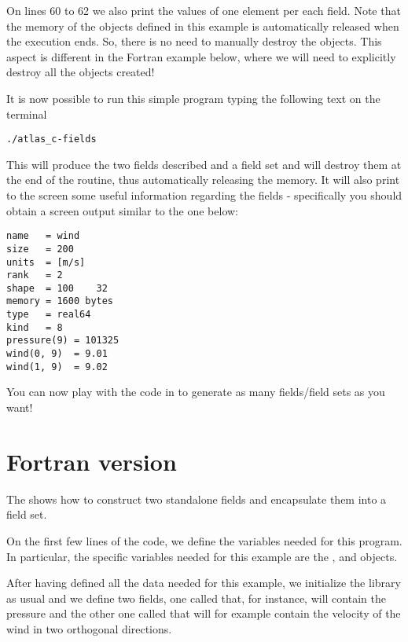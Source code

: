 On lines 60 to 62 we also print the values of one element 
per each field. Note that the memory of the objects defined 
in this example is automatically released when the execution 
ends. So, there is no need to manually destroy the objects.
This aspect is different in the Fortran example below, where 
we will need to explicitly destroy all the objects created!


It is now possible to run this simple program typing
the following text on the terminal
%
\begin{lstlisting}[style=BashStyle]
./atlas_c-fields
\end{lstlisting}
% 
This will produce the two fields described and a field 
set and will destroy them at the end of the routine, 
thus automatically releasing the memory. 
It will also print to the screen some useful information 
regarding the fields - specifically you should obtain 
a screen output similar to the one below:
%
\begin{lstlisting}[style=BashStyle]
name   = wind
size   = 200
units  = [m/s]
rank   = 2
shape  = 100    32
memory = 1600 bytes
type   = real64
kind   = 8
pressure(9) = 101325
wind(0, 9)  = 9.01
wind(1, 9)  = 9.02
\end{lstlisting}
% 
You can now play with the code in  
to generate as many fields/field sets as you want! 



\section{Fortran version}
The  shows how to construct two standalone 
fields and encapsulate them into a field set. 
%

%
On the first few lines of the code, we define the variables
needed for this program. In particular, the \Atlas specific 
variables needed for this example are the , 
 and  objects.

After having defined all the data needed for this example, 
we initialize the \Atlas library as usual and we define 
two fields, one called  that, for 
instance, will contain the pressure and the other one 
called  that will for example contain 
the velocity of the wind in two orthogonal directions.

